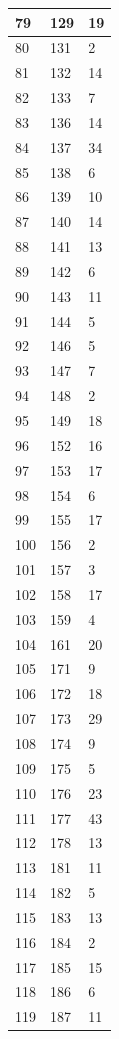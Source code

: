 \begin{tabular}{p{}p{}p{}}
\hline
79 & 129 & 19 \\
\hline
80 & 131 & 2 \\
\hline
81 & 132 & 14 \\
\hline
82 & 133 & 7 \\
\hline
83 & 136 & 14 \\
\hline
84 & 137 & 34 \\
\hline
85 & 138 & 6 \\
\hline
86 & 139 & 10 \\
\hline
87 & 140 & 14 \\
\hline
88 & 141 & 13 \\
\hline
89 & 142 & 6 \\
\hline
90 & 143 & 11 \\
\hline
91 & 144 & 5 \\
\hline
92 & 146 & 5 \\
\hline
93 & 147 & 7 \\
\hline
94 & 148 & 2 \\
\hline
95 & 149 & 18 \\
\hline
96 & 152 & 16 \\
\hline
97 & 153 & 17 \\
\hline
98 & 154 & 6 \\
\hline
99 & 155 & 17 \\
\hline
100 & 156 & 2 \\
\hline
101 & 157 & 3 \\
\hline
102 & 158 & 17 \\
\hline
103 & 159 & 4 \\
\hline
104 & 161 & 20 \\
\hline
105 & 171 & 9 \\
\hline
106 & 172 & 18 \\
\hline
107 & 173 & 29 \\
\hline
108 & 174 & 9 \\
\hline
109 & 175 & 5 \\
\hline
110 & 176 & 23 \\
\hline
111 & 177 & 43 \\
\hline
112 & 178 & 13 \\
\hline
113 & 181 & 11 \\
\hline
114 & 182 & 5 \\
\hline
115 & 183 & 13 \\
\hline
116 & 184 & 2 \\
\hline
117 & 185 & 15 \\
\hline
118 & 186 & 6 \\
\hline
119 & 187 & 11 \\

\end{tabular}
